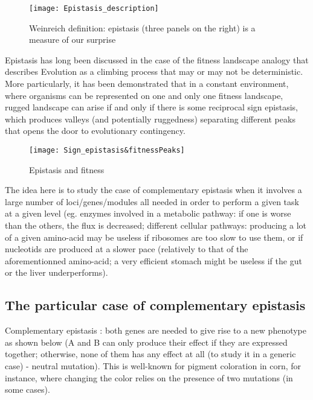 \documentclass[]{article}
\begin{document}
\begin{figure}

{\centering \texttt{[image: Epistasis\_description]} 

}

\caption{Weinreich definition: epistasis (three panels on the right) is a measure of our surprise}\label{fig:epi_gen}
\end{figure}

Epistasis has long been discussed in the case of the fitness landscape
analogy that describes Evolution as a climbing process that may or may
not be deterministic. More particularly, it has been demonstrated that
in a constant environment, where organisms can be represented on one and
only one fitness landscape, rugged landscape can arise if and only if
there is some reciprocal sign epistasis, which produces valleys (and
potentially ruggedness) separating different peaks that opens the door
to evolutionary contingency.

\begin{figure}

{\centering \texttt{[image: Sign\_epistasis\&fitnessPeaks]} 

}

\caption{Epistasis and fitness}\label{fig:epifit}
\end{figure}

The idea here is to study the case of complementary epistasis when it
involves a large number of loci/genes/modules all needed in order to
perform a given task at a given level (eg. enzymes involved in a
metabolic pathway: if one is worse than the others, the flux is
decreased; different cellular pathways: producing a lot of a given
amino-acid may be useless if ribosomes are too slow to use them, or if
nucleotids are produced at a slower pace (relatively to that of the
aforementionned amino-acid; a very efficient stomach might be useless if
the gut or the liver underperforms).

\hypertarget{the-particular-case-of-complementary-epistasis}{%
\subsection{The particular case of complementary
epistasis}\label{the-particular-case-of-complementary-epistasis}}

Complementary epistasis : both genes are needed to give rise to a new
phenotype as shown below (A and B can only produce their effect if they
are expressed together; otherwise, none of them has any effect at all
(to study it in a generic case) - neutral mutation). This is well-known
for pigment coloration in corn, for instance, where changing the color
relies on the presence of two mutations (in some cases).
\end{document}
